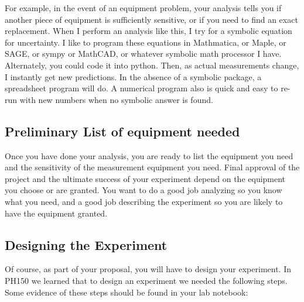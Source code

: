 For example, in the event of an equipment problem, your analysis tells you if another piece of equipment is sufficiently sensitive, or if you need to find an exact replacement. When I perform an analysis like this, I try for a symbolic equation for uncertainty. I like to program these equations in Mathmatica, or Maple, or SAGE, or sympy or MathCAD, or whatever symbolic math processor I have. Alternately, you could code it into python. Then, as actual measurements change, I instantly get new predictions. In the absence of a symbolic package, a spreadsheet program will do. A numerical program also is quick and easy to re-run with new numbers when no symbolic answer is found.

\subsection{Preliminary List of equipment needed}

Once you have done your analysis, you are ready to list the equipment you need and the sensitivity of the measurement equipment you need. Final approval of the project and the ultimate success of your experiment depend on the equipment you choose or are granted. You want to do a good job analyzing so you know what you need, and a good job describing the experiment so you are likely to have the equipment granted.

\subsection{Designing the Experiment}

Of course, as part of your proposal, you will have to design your experiment. In PH150 we learned that to design an experiment we needed the following steps. Some evidence of these steps should be found in your lab notebook:

